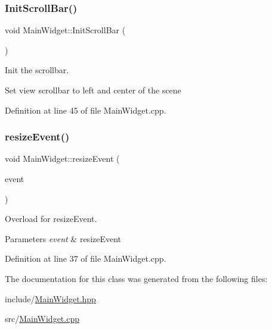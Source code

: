 \subsubsection{\texorpdfstring{Init\+Scroll\+Bar()}{InitScrollBar()}}
{\footnotesize\ttfamily void Main\+Widget\+::\+Init\+Scroll\+Bar (\begin{DoxyParamCaption}{ }\end{DoxyParamCaption})}



Init the scrollbar. 

Set view scrollbar to left and center of the scene 

Definition at line 45 of file Main\+Widget.\+cpp.

\mbox{\label{classMainWidget_a7f5a0d4e7d8ecaa1b284014f9dddb9c5}} 
\subsubsection{\texorpdfstring{resize\+Event()}{resizeEvent()}}
{\footnotesize\ttfamily void Main\+Widget\+::resize\+Event (\begin{DoxyParamCaption}\item[{Q\+Resize\+Event $\ast$}]{event }\end{DoxyParamCaption})\hspace{0.3cm}{\ttfamily [virtual]}}



Overload for resize\+Event. 


\begin{DoxyParams}{Parameters}
{\em event} & resize\+Event \\
\hline
\end{DoxyParams}


Definition at line 37 of file Main\+Widget.\+cpp.



The documentation for this class was generated from the following files\+:\begin{DoxyCompactItemize}
\item 
include/\mbox{\hyperlink{MainWidget_8hpp}{Main\+Widget.\+hpp}}\item 
src/\mbox{\hyperlink{MainWidget_8cpp}{Main\+Widget.\+cpp}}\end{DoxyCompactItemize}
